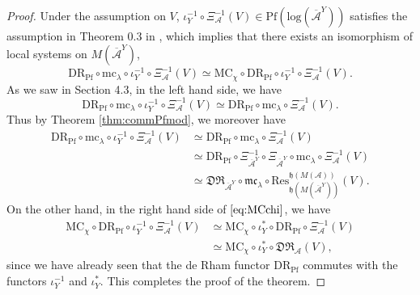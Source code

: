 \documentclass[a4paper,12pt]{article}
\theoremstyle{definition}
\theoremstyle{remark}
\begin{document}
\begin{proof}
Under the assumption on $V$, $\iota_{Y}^{-1}\circ \Xi^{-1}_{\mathcal{A}}(V)\in \mathrm{Pf}(\mathrm{log}(\overline{\mathcal{A}}^{Y}))$
satisfies the assumption in Theorem 0.3 in \cite{AdaHir}, which implies that there exists an isomorphism of local systems on $M(\overline{\mathcal{A}}^{Y})$,
\begin{equation}\label{eq:MCchi}
	\mathrm{DR}_{\mathrm{Pf}}\circ \mathrm{mc}_{\lambda}\circ \iota_{Y}^{-1}\circ \Xi^{-1}_{\mathcal{A}}(V)\simeq \mathrm{MC}_{\chi}\circ \mathrm{DR}_{\mathrm{Pf}}\circ \iota_{Y}^{-1}\circ \Xi^{-1}_{\mathcal{A}}(V).
\end{equation}
As we saw in Section 4.3, in the left hand side, we have 
\[
	\mathrm{DR}_{\mathrm{Pf}}\circ \mathrm{mc}_{\lambda}\circ \iota_{Y}^{-1}\circ \Xi^{-1}_{\mathcal{A}}(V)\simeq \mathrm{DR}_{\mathrm{Pf}}\circ \mathrm{mc}_{\lambda}\circ \Xi^{-1}_{\mathcal{A}}(V).
\]
Thus by Theorem \ref{thm:commPfmod}, we moreover have 
\begin{align*}
\mathrm{DR}_{\mathrm{Pf}}\circ \mathrm{mc}_{\lambda}\circ \iota_{Y}^{-1}\circ \Xi^{-1}_{\mathcal{A}}(V)&\simeq \mathrm{DR}_{\mathrm{Pf}}\circ \mathrm{mc}_{\lambda}\circ \Xi^{-1}_{\mathcal{A}}(V)\\
&\simeq \mathrm{DR}_{\mathrm{Pf}}\circ \Xi_{\overline{\mathcal{A}}^{Y}}^{-1}\circ \Xi_{\overline{\mathcal{A}}^{Y}}\circ  \mathrm{mc}_{\lambda}\circ \Xi^{-1}_{\mathcal{A}}(V)\\
&\simeq \mathfrak{DR}_{\overline{\mathcal{A}}^{Y}}\circ \mathfrak{mc}_{\lambda}\circ \mathrm{Res}_{\mathfrak{h}(M(\overline{\mathcal{A}}^{Y}))}^{\mathfrak{h}(M(\mathcal{A}))}(V).
\end{align*}
On the other hand, in the right hand side of $\eqref{eq:MCchi}$, we have
\begin{align*}
\mathrm{MC}_{\chi}\circ \mathrm{DR}_{\mathrm{Pf}}\circ \iota_{Y}^{-1}\circ \Xi^{-1}_{\mathcal{A}}(V)
&\simeq \mathrm{MC}_{\chi}\circ \iota_{Y}^{*}\circ \mathrm{DR}_{\mathrm{Pf}}\circ \Xi^{-1}_{\mathcal{A}}(V)\\
&\simeq \mathrm{MC}_{\chi}\circ \iota_{Y}^{*}\circ \mathfrak{DR}_{\mathcal{A}}(V),
\end{align*}
since we have already seen that the de Rham functor $\mathrm{DR}_{\mathrm{Pf}}$ commutes with the functors $\iota_{Y}^{-1}$ and $\iota_{Y}^{*}$.
This completes the proof of the theorem.
\end{proof}	
 

\end{document}
